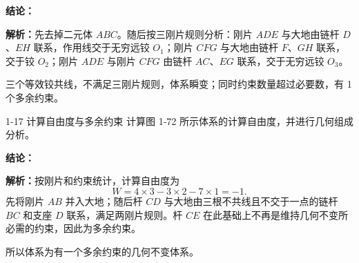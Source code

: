 \begin{solutioncard}
\textbf{结论：}

\textbf{解析：}先去掉二元体 \(ABC\)。随后按三刚片规则分析：刚片 \(ADE\) 与大地由链杆 \(D\)、\(EH\) 联系，作用线交于无穷远铰 \(O_1\)；刚片 \(CFG\) 与大地由链杆 \(F\)、\(GH\) 联系，交于铰 \(O_2\)；刚片 \(ADE\) 与刚片 \(CFG\) 由链杆 \(AC\)、\(EG\) 联系，交于无穷远铰 \(O_3\)。

三个等效铰共线，不满足三刚片规则，体系瞬变；同时约束数量超过必要数，有 1 个多余约束。
\end{solutioncard}

\begin{problemcard}{1-17 计算自由度与多余约束 }
计算图 1-72 所示体系的计算自由度，并进行几何组成分析。

\begin{figure}[H]
\centering
{}
\end{figure}
\end{problemcard}

\begin{solutioncard}
\textbf{结论：}

\textbf{解析：}按刚片和约束统计，计算自由度为
\[
  W=4\times 3-3\times 2-7\times 1=-1 .
\]
先将刚片 \(AB\) 并入大地；随后杆 \(CD\) 与大地由三根不共线且不交于一点的链杆 \(BC\) 和支座 \(D\) 联系，满足两刚片规则。杆 \(CE\) 在此基础上不再是维持几何不变所必需的约束，因此为多余约束。

所以体系为有一个多余约束的几何不变体系。
\end{solutioncard}

